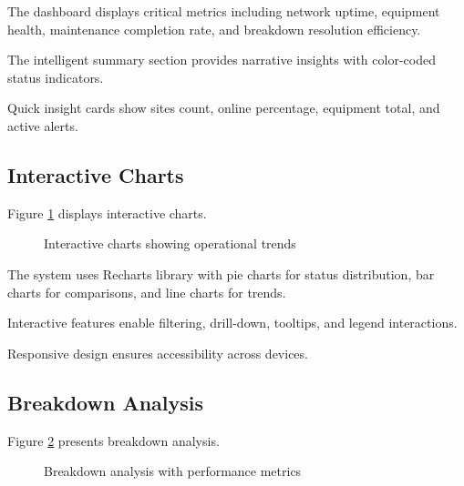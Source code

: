 The dashboard displays critical metrics including network uptime, equipment health, maintenance completion rate, and breakdown resolution efficiency.

The intelligent summary section provides narrative insights with color-coded status indicators.

Quick insight cards show sites count, online percentage, equipment total, and active alerts.

\subsection{Interactive Charts}

Figure \ref{fig:sprint5-impl2} displays interactive charts.

\begin{figure}[H]
\centering
{}
\caption{Interactive charts showing operational trends}
\label{fig:sprint5-impl2}
\end{figure}

The system uses Recharts library with pie charts for status distribution, bar charts for comparisons, and line charts for trends.

Interactive features enable filtering, drill-down, tooltips, and legend interactions.

Responsive design ensures accessibility across devices.

\subsection{Breakdown Analysis}

Figure \ref{fig:sprint5-impl3} presents breakdown analysis.

\begin{figure}[H]
\centering
{}
\caption{Breakdown analysis with performance metrics}
\label{fig:sprint5-impl3}
\end{figure}

